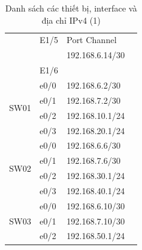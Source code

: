 \documentclass[13pt]{article}
\begin{document}
\begin{enumerate}
\begin{table}[h!]
\begin{tabular}{|p{3cm}|p{3cm}|p{4cm}|p{3cm}|}
                                & E1/5 & Port Channel \\ 
                                &      & 192.168.6.14/30 \\ \cline{2-3}
                                & E1/6 & \\ \hline
     \multirow{4}{*}{SW01} & e0/0 & 192.168.6.2/30 \\ \cline{2-3}
                                & e0/1 & 192.168.7.2/30 \\ \cline{2-3}
                                & e0/2 & 192.168.10.1/24 \\ \cline{2-3}
                                & e0/3 & 192.168.20.1/24 \\ \hline
        \multirow{4}{*}{SW02} & e0/0 & 192.168.6.6/30 \\ \cline{2-3}
                                & e0/1 & 192.168.7.6/30 \\ \cline{2-3}
                                & e0/2 & 192.168.30.1/24 \\ \cline{2-3}
                                & e0/3 & 192.168.40.1/24 \\ \hline
    \multirow{3}{*}{SW03} & e0/0 & 192.168.6.10/30 \\ \cline{2-3}
                                & e0/1 & 192.168.7.10/30 \\ \cline{2-3}
                                & e0/2 & 192.168.50.1/24 \\
        \hline
    \end{tabular}
    \caption{Danh sách các thiết bị, interface và địa chỉ IPv4 (1)}
    \label{table:ipv4}
\end{table}


\end{enumerate}
\end{document}

